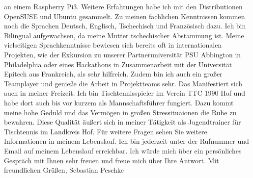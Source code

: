 an einem Raspberry Pi3. Weitere Erfahrungen habe ich mit den Distributionen OpenSUSE und Ubuntu gesammelt. \newline\newline
Zu meinen fachlichen Kenntnissen kommen noch die Sprachen Deutsch, Englisch, Tschechisch und Französisch dazu. Ich bin Bilingual aufgewachsen, da meine Mutter tschechischer Abstammung ist.
Meine vielseitigen Sprachkenntnisse bewiesen sich bereits oft in internationalen Projekten, wie der Exkursion zu unserer Partneruniversität PSU Abbington in Philadelphia oder
eines Hackathons in Zusammenarbeit mit der Universität Epitech aus Frankreich, als sehr hilfreich. \newline\newline
Zudem bin ich auch ein großer Teamplayer und genieße die Arbeit in Projektteams sehr. Das Manifestiert sich auch in meiner Freizeit. Ich bin Tischtennisspieler im Verein TTC 1990 Hof
und habe dort auch bis vor kurzem als Mannschaftsführer fungiert. Dazu kommt meine hohe Geduld und das Vermögen in großen Stressituaionen die Ruhe zu bewahren. Diese Qualität äußert sich
in meiner Tätigkeit als Jugendtrainer für Tischtennis im Landkreis Hof. \newline\newline
Für weitere Fragen sehen Sie weitere Informationen in meinem Lebenslauf. Ich bin jederzeit unter der Rufnummer und Email auf meinem Lebenslauf erreichbar. Ich würde mich über ein
persönliches Gespräch mit Ihnen sehr freuen und freue mich über Ihre Antwort. \newline\newline
\noindent
Mit freundlichen Grüßen,\newline
Sebastian Peschke